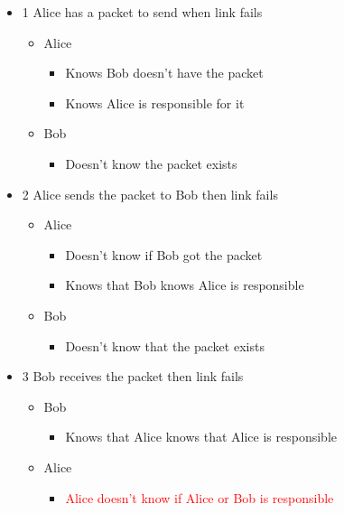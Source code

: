 \begin{itemize}
    \item 1  Alice has a packet to send when link fails
    \begin{itemize}
        \item Alice
        \begin{itemize}
            \item Knows Bob doesn’t have the packet
            \item Knows Alice is responsible for it
        \end{itemize}
        \item Bob
        \begin{itemize}
            \item Doesn’t know the packet exists
        \end{itemize}
    \end{itemize}
    
    \item 2 Alice sends the packet to Bob then link fails
    \begin{itemize}
        \item Alice
        \begin{itemize}
            \item Doesn’t know if Bob got the packet
            \item Knows that Bob knows Alice is responsible
        \end{itemize}
        \item Bob
        \begin{itemize}
            \item Doesn’t know that the packet exists
        \end{itemize}
    \end{itemize}

    \item  3 Bob receives the packet then link fails
    \begin{itemize}
        \item Bob
        \begin{itemize}
            \item Knows that Alice knows that Alice is responsible
        \end{itemize}
        \item Alice
        \begin{itemize}
            \item \textcolor{red}{Alice doesn’t know if Alice or Bob is responsible}
        \end{itemize}
    \end{itemize}


\end{itemize}
